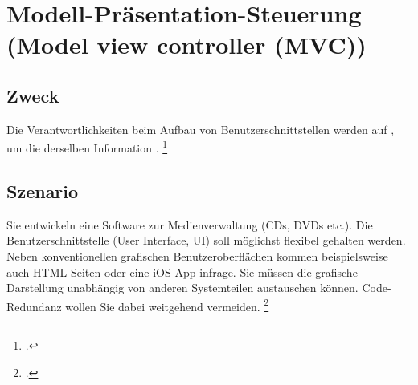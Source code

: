 \documentclass{bschlangaul-haupt}
\begin{document}

\chapter{Modell-Präsentation-Steuerung (Model view controller (MVC))}

\begin{liQuellen}
\item \cite{wiki:mvc}
\item \cite[Kapitel „Observer“, Seite 256]{gof}
\item \cite[Kapitel 5.6, Seite 92-95]{eilebrecht}
\item \cite[Kapitel 3.8, Seite 48-49]{siebler}
\end{liQuellen}

%

\liEntwurfsModellPraesentationSteuerungUml

\section{Zweck}

Die Verantwortlichkeiten beim Aufbau von Benutzerschnittstellen werden
auf , um die
 derselben Information .
\footcite[Seite 92]{eilebrecht}

%

\section{Szenario}

Sie entwickeln eine Software zur Medienverwaltung (CDs, DVDs etc.). Die
Benutzerschnittstelle (User Interface, UI) soll möglichst flexibel
gehalten werden. Neben konventionellen grafischen Benutzeroberflächen
kommen beispielsweise auch HTML-Seiten oder eine iOS-App infrage. Sie
müssen die grafische Darstellung unabhängig von anderen Systemteilen
austauschen können. Code-Redundanz wollen Sie dabei weitgehend
vermeiden.
\footcite[Seite 92]{eilebrecht}

\literatur
\end{document}
